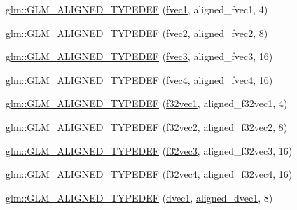 \begin{DoxyCompactItemize}
\item 
\mbox{\hyperlink{group__gtx__type__aligned_gaefab04611c7f8fe1fd9be3071efea6cc}{glm\+::\+G\+L\+M\+\_\+\+A\+L\+I\+G\+N\+E\+D\+\_\+\+T\+Y\+P\+E\+D\+EF}} (\mbox{\hyperlink{group__gtc__type__precision_gaed54853d0f184df0e5fbd9f9118c477b}{fvec1}}, aligned\+\_\+fvec1, 4)
\item 
\mbox{\hyperlink{group__gtx__type__aligned_ga2543c05ba19b3bd19d45b1227390c5b4}{glm\+::\+G\+L\+M\+\_\+\+A\+L\+I\+G\+N\+E\+D\+\_\+\+T\+Y\+P\+E\+D\+EF}} (\mbox{\hyperlink{group__gtc__type__precision_gaabc3d7a259968a12108c052ff9265148}{fvec2}}, aligned\+\_\+fvec2, 8)
\item 
\mbox{\hyperlink{group__gtx__type__aligned_ga009afd727fd657ef33a18754d6d28f60}{glm\+::\+G\+L\+M\+\_\+\+A\+L\+I\+G\+N\+E\+D\+\_\+\+T\+Y\+P\+E\+D\+EF}} (\mbox{\hyperlink{group__gtc__type__precision_gaf7cdc93898ec0c11f1cff54bd72d022b}{fvec3}}, aligned\+\_\+fvec3, 16)
\item 
\mbox{\hyperlink{group__gtx__type__aligned_ga2f26177e74bfb301a3d0e02ec3c3ef53}{glm\+::\+G\+L\+M\+\_\+\+A\+L\+I\+G\+N\+E\+D\+\_\+\+T\+Y\+P\+E\+D\+EF}} (\mbox{\hyperlink{group__gtc__type__precision_ga0319cdd208269c180e326b243e2e84e4}{fvec4}}, aligned\+\_\+fvec4, 16)
\item 
\mbox{\hyperlink{group__gtx__type__aligned_ga309f495a1d6b75ddf195b674b65cb1e4}{glm\+::\+G\+L\+M\+\_\+\+A\+L\+I\+G\+N\+E\+D\+\_\+\+T\+Y\+P\+E\+D\+EF}} (\mbox{\hyperlink{group__gtc__type__precision_ga27d40e360fd5b6ad39ca34ded8210b53}{f32vec1}}, aligned\+\_\+f32vec1, 4)
\item 
\mbox{\hyperlink{group__gtx__type__aligned_ga5e185865a2217d0cd47187644683a8c3}{glm\+::\+G\+L\+M\+\_\+\+A\+L\+I\+G\+N\+E\+D\+\_\+\+T\+Y\+P\+E\+D\+EF}} (\mbox{\hyperlink{group__gtc__type__precision_gaeb896022a9c59e8c3c4ce627c66c9262}{f32vec2}}, aligned\+\_\+f32vec2, 8)
\item 
\mbox{\hyperlink{group__gtx__type__aligned_gade4458b27b039b9ca34f8ec049f3115a}{glm\+::\+G\+L\+M\+\_\+\+A\+L\+I\+G\+N\+E\+D\+\_\+\+T\+Y\+P\+E\+D\+EF}} (\mbox{\hyperlink{group__gtc__type__precision_ga4d08db2a75d1e8f85e0edbbd76f18ecf}{f32vec3}}, aligned\+\_\+f32vec3, 16)
\item 
\mbox{\hyperlink{group__gtx__type__aligned_ga2e8a12c5e6a9c4ae4ddaeda1d1cffe3b}{glm\+::\+G\+L\+M\+\_\+\+A\+L\+I\+G\+N\+E\+D\+\_\+\+T\+Y\+P\+E\+D\+EF}} (\mbox{\hyperlink{group__gtc__type__precision_ga03e165a8b1ffe77625530fa335699e06}{f32vec4}}, aligned\+\_\+f32vec4, 16)
\item 
\mbox{\hyperlink{group__gtx__type__aligned_ga3e0f35fa0c626285a8bad41707e7316c}{glm\+::\+G\+L\+M\+\_\+\+A\+L\+I\+G\+N\+E\+D\+\_\+\+T\+Y\+P\+E\+D\+EF}} (\mbox{\hyperlink{group__ext__vec1_ga8d5252eec287cf34cc18a219a118f9f2}{dvec1}}, \mbox{\hyperlink{group__gtc__type__aligned_ga81fe4410dc880770293c53fcba83c9e4}{aligned\+\_\+dvec1}}, 8)

\end{DoxyCompactItemize}
